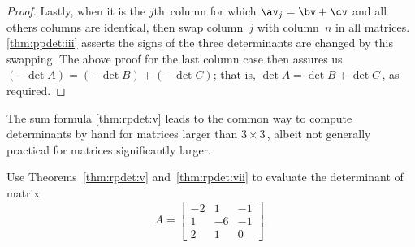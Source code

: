 \begin{proof}
Lastly, when it is the \(j\)th~column for which \(\av_j=\bv+\cv\) and all others columns are identical, then swap column~\(j\) with column~\(n\) in all matrices.  
\autoref{thm:ppdet:iii} asserts the signs of the three determinants are changed by this swapping.
The above proof for the last column case then assures us \((-\det A)=(-\det B)+(-\det C)\); that is, \(\det A=\det B+\det C\)\,, as required. 
\end{proof}


The sum formula \autoref{thm:rpdet:v} leads to the common way to compute determinants by hand for matrices larger than \(3\times3\)\,, albeit not generally practical for matrices significantly larger.

\begin{example} \label{eg:}
Use Theorems~\ref{thm:rpdet:v} and~\ref{thm:rpdet:vii} to evaluate the determinant of matrix
\begin{equation*}
A=\begin{bmatrix}   -2&1&-1
\\   1 & -6 & -1
\\   2 &  1 & 0
\end{bmatrix}.
\end{equation*}


\end{example}
